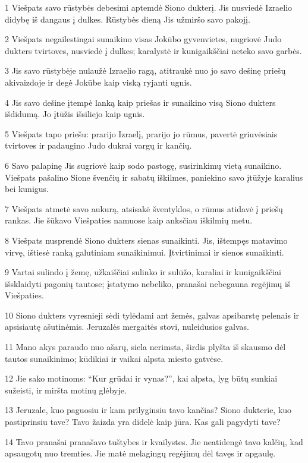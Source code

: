 \par 1 Viešpats savo rūstybės debesimi aptemdė Siono dukterį. Jis nusviedė Izraelio didybę iš dangaus į dulkes. Rūstybės dieną Jis užmiršo savo pakojį. 
\par 2 Viešpats negailestingai sunaikino visas Jokūbo gyvenvietes, nugriovė Judo dukters tvirtoves, nusviedė į dulkes; karalystė ir kunigaikščiai neteko savo garbės. 
\par 3 Jis savo rūstybėje nulaužė Izraelio ragą, atitraukė nuo jo savo dešinę priešų akivaizdoje ir degė Jokūbe kaip viską ryjanti ugnis. 
\par 4 Jis savo dešine įtempė lanką kaip priešas ir sunaikino visą Siono dukters išdidumą. Jo įtūžis išsiliejo kaip ugnis. 
\par 5 Viešpats tapo priešu: prarijo Izraelį, prarijo jo rūmus, pavertė griuvėsiais tvirtoves ir padaugino Judo dukrai vargų ir kančių. 
\par 6 Savo palapinę Jis sugriovė kaip sodo pastogę, susirinkimų vietą sunaikino. Viešpats pašalino Sione švenčių ir sabatų iškilmes, paniekino savo įtūžyje karalius bei kunigus. 
\par 7 Viešpats atmetė savo aukurą, atsisakė šventyklos, o rūmus atidavė į priešų rankas. Jie šūkavo Viešpaties namuose kaip anksčiau iškilmių metu. 
\par 8 Viešpats nusprendė Siono dukters sienas sunaikinti. Jis, ištempęs matavimo virvę, ištiesė ranką galutiniam sunaikinimui. Įtvirtinimai ir sienos sunaikinti. 
\par 9 Vartai sulindo į žemę, užkaiščiai sulinko ir sulūžo, karaliai ir kunigaikščiai išsklaidyti pagonių tautose; įstatymo nebeliko, pranašai nebegauna regėjimų iš Viešpaties. 
\par 10 Siono dukters vyresnieji sėdi tylėdami ant žemės, galvas apsibarstę pelenais ir apsisiautę ašutinėmis. Jeruzalės mergaitės stovi, nuleidusios galvas. 
\par 11 Mano akys paraudo nuo ašarų, siela nerimsta, širdis plyšta iš skausmo dėl tautos sunaikinimo; kūdikiai ir vaikai alpsta miesto gatvėse. 
\par 12 Jie sako motinoms: “Kur grūdai ir vynas?”, kai alpsta, lyg būtų sunkiai sužeisti, ir miršta motinų glėbyje. 
\par 13 Jeruzale, kuo paguosiu ir kam prilyginsiu tavo kančias? Siono dukterie, kuo pastiprinsiu tave? Tavo žaizda yra didelė kaip jūra. Kas gali pagydyti tave? 
\par 14 Tavo pranašai pranašavo tuštybes ir kvailystes. Jie neatidengė tavo kalčių, kad apsaugotų nuo tremties. Jie matė melagingų regėjimų dėl tavęs ir apgaulę. 
